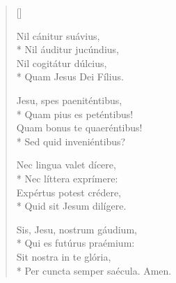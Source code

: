 \newHymn
\JustHymnNum
{}




\pointtrans
\begin{multicols}{2}
\begin{verse}[\versewidth]


Nil cánitur suávius,\\*
Nil áuditur jucúndius,\\
Nil cogitátur dúlcius,\\*
Quam Jesus Dei Fílius.


Jesu, spes paeniténtibus,\\*
Quam pius es peténtibus!\\
Quam bonus te quaeréntibus!\\*
Sed quid inveniéntibus? 

Nec lingua valet dícere,\\*
Nec líttera exprímere:\\
Expértus potest crédere,\\*
Quid sit Jesum dilígere. 

Sis, Jesu, nostrum gáudium,\\*
Qui es futúrus praémium:\\
Sit nostra in te glória,\\*
Per cuncta semper saécula.
Amen. 

\end{verse}
\end{multicols}

